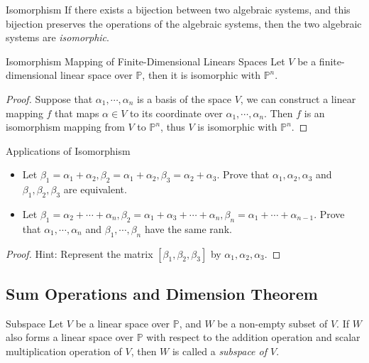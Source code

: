 \begin{definition}{Isomorphism}{}
  If there exists a bijection between two algebraic systems,
  and this bijection preserves the operations of the algebraic systems,
  then the two algebraic systems are \emph{isomorphic}.
\end{definition}

\begin{theorem}{Isomorphism Mapping of Finite-Dimensional Linears Spaces}{}
  Let $V$ be a finite-dimensional linear space over $\mathbb{P}$,
  then it is isomorphic with $\mathbb{P}^n$.
\end{theorem}

\begin{proof}
  Suppose that $\alpha_1, \cdots, \alpha_n$ is a basis of the space $V$,
  we can construct a linear mapping $f$ that maps $\alpha \in V$ to
  its coordinate over $\alpha_1, \cdots, \alpha_n$.
  Then $f$ is an isomorphism mapping from $V$ to $\mathbb{P}^n$,
  thus $V$ is isomorphic with $\mathbb{P}^n$.
\end{proof}

\begin{example}{Applications of Isomorphism}{}
  \begin{itemize}
  \item Let $\beta_1 = \alpha_1 + \alpha_2, \beta_2 = \alpha_1 + \alpha_2,
    \beta_3 = \alpha_2 + \alpha_3$. Prove that $\alpha_1, \alpha_2, \alpha_3$
    and $\beta_1, \beta_2, \beta_3$ are equivalent.
  \item Let $\beta_1 = \alpha_2 + \cdots + \alpha_n,
    \beta_2 = \alpha_1 + \alpha_3 + \cdots + \alpha_n,
    \beta_n = \alpha_1 + \cdots + \alpha_{n-1}$.
    Prove that $\alpha_1, \cdots, \alpha_n$ and $\beta_1, \cdots, \beta_n$ have
    the same rank.
  \end{itemize}
\end{example}

\begin{proof}
  Hint: Represent the matrix $[\beta_1, \beta_2, \beta_3]$ by $\alpha_1, \alpha_2, \alpha_3$.
\end{proof}

\subsection{Sum Operations and Dimension Theorem}

\begin{definition}{Subspace}{}
  Let $V$ be a linear space over $\mathbb{P}$,
  and $W$ be a non-empty subset of $V$.
  If $W$ also forms a linear space over $\mathbb{P}$ with respect to
  the addition operation and scalar multiplication operation of $V$,
  then $W$ is called a \emph{subspace of $V$}.
\end{definition}

